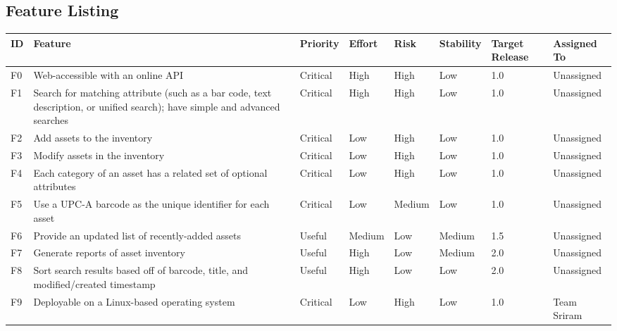 \documentclass{article}
\begin{document}
\subsection{Feature Listing}
\begin{tabular}{ | p{0.15in} | p{2.0in} | p{0.5in} | p{0.5in} | p{0.5in} | p{0.6in} | p{0.5in} | p{0.65in} | }
\hline
\textbf{ID} & \textbf{Feature} & \textbf{Priority} & \textbf{Effort} & \textbf{Risk} & \textbf{Stability} & \textbf{Target Release} & \textbf{Assigned To} \\
\hline
\hline
F0 & Web-accessible with an online API & Critical & High & High & Low & 1.0 & Unassigned \\
\hline
F1 & Search for matching attribute (such as a bar code, text description, or unified search); have simple and advanced searches & Critical & High & High & Low & 1.0 & Unassigned \\
\hline
F2 & Add assets to the inventory & Critical & Low & High & Low & 1.0 & Unassigned \\
\hline
F3 & Modify assets in the inventory & Critical & Low & High & Low & 1.0 & Unassigned \\
\hline
F4 & Each category of an asset has a related set of optional attributes & Critical & Low & High & Low & 1.0 & Unassigned \\
\hline
F5 & Use a UPC-A barcode as the unique identifier for each asset & Critical & Low & Medium & Low & 1.0 & Unassigned \\
\hline
F6 & Provide an updated list of recently-added assets & Useful & Medium & Low & Medium & 1.5 & Unassigned \\
\hline
F7 & Generate reports of asset inventory & Useful & High & Low & Medium & 2.0 & Unassigned \\
\hline
F8 & Sort search results based off of barcode, title, and modified/created timestamp & Useful & High & Low & Low & 2.0 & Unassigned \\
\hline
F9 & Deployable on a Linux-based operating system & Critical & Low & High & Low & 1.0 & Team Sriram \\
\hline
\end{tabular}\\
~\\
~\\
\end{document}
